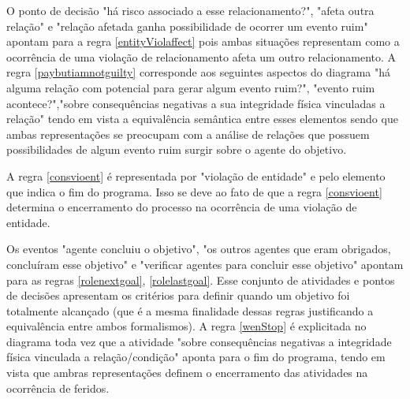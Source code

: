 O ponto de decisão "há risco associado a esse relacionamento?", "afeta  outra relação" e "relação afetada ganha possibilidade de ocorrer um evento ruim" apontam para a regra \ref{entityViolaffect} pois ambas situações representam como a ocorrência de uma violação de relacionamento afeta um outro relacionamento. A regra \ref{paybutiamnotguilty} corresponde aos seguintes aspectos do diagrama "há alguma relação com potencial para gerar algum evento ruim?", "evento ruim acontece?","sobre consequências negativas a sua integridade física vinculadas a relação" tendo em vista a equivalência semântica entre esses elementos sendo que ambas representações se preocupam com a análise de relações que possuem possibilidades de algum evento ruim surgir sobre o agente do objetivo. 

A regra \ref{consvioent} é representada por "violação de entidade" e pelo elemento que indica o fim do programa. Isso se deve ao fato de que a regra \ref{consvioent} determina o encerramento do processo na ocorrência de uma violação de entidade. 

Os eventos "agente concluiu o objetivo", "os outros agentes que eram obrigados, concluíram esse objetivo" e "verificar agentes para concluir esse objetivo" apontam para as regras \ref{rolenextgoal}, \ref{rolelastgoal}. Esse conjunto de atividades e pontos de decisões apresentam os critérios para definir quando um objetivo foi totalmente alcançado (que é a mesma finalidade dessas regras justificando a equivalência entre ambos formalismos).  A regra \ref{wenStop} é explicitada no diagrama toda vez que a atividade "sobre consequências negativas a integridade física vinculada  a relação/condição" aponta para o fim do programa, tendo em vista que ambras representações definem o encerramento das atividades na ocorrência de feridos. 

